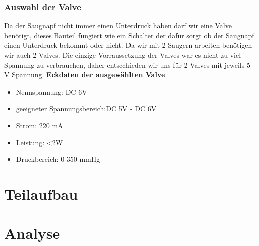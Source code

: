 \subsubsection{Auswahl der Valve}
Da der Saugnapf nicht immer einen Unterdruck haben darf wir eine Valve benötigt, dieses Bauteil fungiert wie ein
Schalter der dafür sorgt ob der Saugnapf einen Unterdruck bekommt oder nicht. Da wir mit 2 Saugern arbeiten benötigen wir
auch 2 Valves. Die einzige Vorraussetzung der Valves war es nicht zu viel Spannung zu verbrauchen, daher entscchieden
wir uns für 2 Valves mit jeweils 5 V Spannung.
\textbf{Eckdaten der ausgewählten Valve}
\begin{itemize}
    \item Nennspannung: DC 6V
    \item geeigneter Spannungsbereich:DC 5V - DC 6V
    \item Strom: 220 mA
    \item Leistung: <2W
    \item Druckbereich: 0-350 mmHg
\end{itemize}

\section{Teilaufbau}

\section{Analyse}